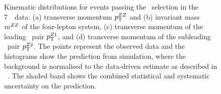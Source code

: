 \begin{figure}[htbp]
\begin{center}
    \caption[Kinematic distributions for events passing the \ZZs\ selection in
    the 7~\tev\ data.]
    {Kinematic distributions for events passing the \ZZs\ selection in
    the 7~\tev\ data: (a) transverse momentum $p_{\mathrm{T}}^{ZZ}$ and (b) invariant mass $m^{ZZ}$ of the 
    four-lepton system, (c) transverse momentum of the leading
    \dilep\ pair $p_{\mathrm{T}}^{Z1}$, and (d) transverse momentum of the subleading
    \dilep\ pair $p_{\mathrm{T}}^{Z2}$. The points represent the observed data and the 
    histograms show the prediction from simulation, where the background
    is normalised to the data-driven estimate as described in
    ~. The shaded band 
    shows the combined statistical and systematic uncertainty on the prediction. 
    }
\end{center}
    \label{fig:zzdists-ZZs-seven}
\end{figure}


